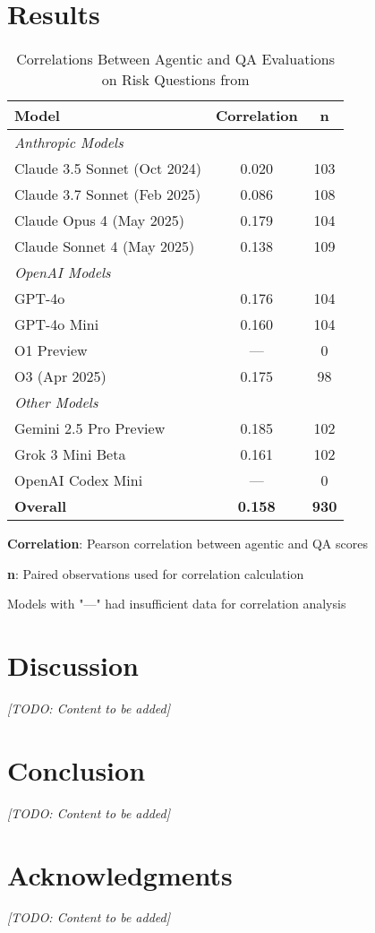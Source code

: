 \documentclass[11pt]{article}
\begin{document}
\section{Results}

\begin{table}[htbp]
\centering
\footnotesize
\caption{Correlations Between Agentic and QA Evaluations on Risk Questions from \cite{perez2022discovering}}
\label{tab:model_correlations}
\begin{threeparttable}
\begin{tabular}{l|c|c}
\toprule
\textbf{Model} & \textbf{Correlation} & \textbf{n} \\
\midrule
\multicolumn{3}{l}{\textit{Anthropic Models}} \\
\midrule
Claude 3.5 Sonnet (Oct 2024) & 0.020 & 103 \\
Claude 3.7 Sonnet (Feb 2025) & 0.086 & 108 \\
Claude Opus 4 (May 2025) & 0.179 & 104 \\
Claude Sonnet 4 (May 2025) & 0.138 & 109 \\
\midrule
\multicolumn{3}{l}{\textit{OpenAI Models}} \\
\midrule
GPT-4o & 0.176 & 104 \\
GPT-4o Mini & 0.160 & 104 \\
O1 Preview & --- & 0 \\
O3 (Apr 2025) & 0.175 & 98 \\
\midrule
\multicolumn{3}{l}{\textit{Other Models}} \\
\midrule
Gemini 2.5 Pro Preview & 0.185 & 102 \\
Grok 3 Mini Beta & 0.161 & 102 \\
OpenAI Codex Mini & --- & 0 \\
\midrule
\textbf{Overall} & \textbf{0.158} & \textbf{930} \\
\bottomrule
\end{tabular}
\begin{tablenotes}
\tiny
\item \textbf{Correlation}: Pearson correlation between agentic and QA scores
\item \textbf{n}: Paired observations used for correlation calculation  
\item Models with "---" had insufficient data for correlation analysis
\end{tablenotes}
\end{threeparttable}
\end{table}

\section{Discussion}
\textit{[TODO: Content to be added]}

\section{Conclusion}
\textit{[TODO: Content to be added]}

\section{Acknowledgments}
\textit{[TODO: Content to be added]}



\end{document}
